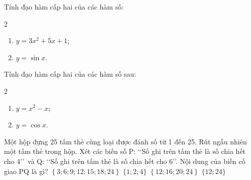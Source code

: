 \begin{bt}%

	Tính đạo hàm cấp hai của các hàm số:
	\begin{multicols}{2}
		\begin{enumerate}
			\item $y=3x^2+5x+1$;
			\item $y=\sin x$.
		\end{enumerate}
	\end{multicols}
\end{bt}

\begin{bt}%

	Tính đạo hàm cấp hai của các hàm số sau:
	\begin{multicols}{2}
		\begin{enumerate}
			\item $y=x^2-x$;
			\item $y=\cos x$.
		\end{enumerate}
	\end{multicols}	
\end{bt}

\begin{ex}%
	Một hộp đựng 25 tấm thẻ cùng loại được đánh số từ 1 đến 25. Rút ngẫu nhiên một tấm thẻ trong hộp. Xét các biến số P: \lq\lq Số ghi  trên tấm thẻ là số chia hết cho 4\rq\rq \, và Q: \lq\lq Số ghi trên tấm thẻ là số chia hết cho 6\rq\rq. Nội dung của biến cố giao PQ là gì?
	\choice 
		 {$\left\{3;6;9;12;15;18;24\right\}$}
		 {$\{1;2;4\}$}
		 {$\left\{12;16;20;24\right\}$}
		 {\True $\{12;24\}$}
\end{ex}

